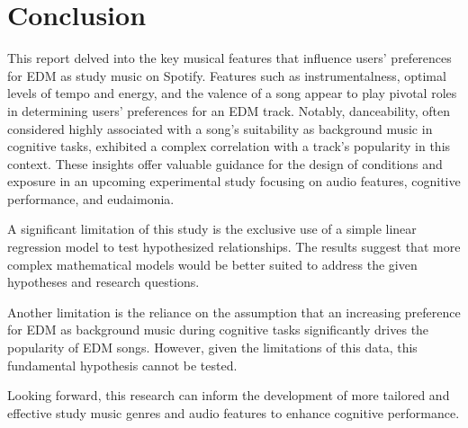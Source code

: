 \documentclass[
]{book}
\begin{document}
\hypertarget{conclusion}{%
\chapter{Conclusion}\label{conclusion}}

This report delved into the key musical features that influence users' preferences for EDM as study music on Spotify. Features such as instrumentalness, optimal levels of tempo and energy, and the valence of a song appear to play pivotal roles in determining users' preferences for an EDM track. Notably, danceability, often considered highly associated with a song's suitability as background music in cognitive tasks, exhibited a complex correlation with a track's popularity in this context. These insights offer valuable guidance for the design of conditions and exposure in an upcoming experimental study focusing on audio features, cognitive performance, and eudaimonia.

A significant limitation of this study is the exclusive use of a simple linear regression model to test hypothesized relationships. The results suggest that more complex mathematical models would be better suited to address the given hypotheses and research questions.

Another limitation is the reliance on the assumption that an increasing preference for EDM as background music during cognitive tasks significantly drives the popularity of EDM songs. However, given the limitations of this data, this fundamental hypothesis cannot be tested.

Looking forward, this research can inform the development of more tailored and effective study music genres and audio features to enhance cognitive performance.

  
\end{document}
